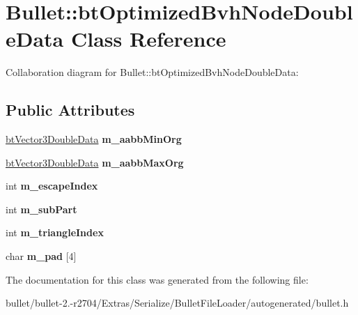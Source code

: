 \hypertarget{class_bullet_1_1bt_optimized_bvh_node_double_data}{\section{Bullet\+:\+:bt\+Optimized\+Bvh\+Node\+Double\+Data Class Reference}
\label{class_bullet_1_1bt_optimized_bvh_node_double_data}
}


Collaboration diagram for Bullet\+:\+:bt\+Optimized\+Bvh\+Node\+Double\+Data\+:
\subsection*{Public Attributes}
\begin{DoxyCompactItemize}
\item 
\hypertarget{class_bullet_1_1bt_optimized_bvh_node_double_data_af91bb104a9c2d089522a8e490e0158e2}{\hyperlink{class_bullet_1_1bt_vector3_double_data}{bt\+Vector3\+Double\+Data} {\bfseries m\+\_\+aabb\+Min\+Org}}\label{class_bullet_1_1bt_optimized_bvh_node_double_data_af91bb104a9c2d089522a8e490e0158e2}

\item 
\hypertarget{class_bullet_1_1bt_optimized_bvh_node_double_data_a8c56c16493d9f31fcc070a5057eb9e99}{\hyperlink{class_bullet_1_1bt_vector3_double_data}{bt\+Vector3\+Double\+Data} {\bfseries m\+\_\+aabb\+Max\+Org}}\label{class_bullet_1_1bt_optimized_bvh_node_double_data_a8c56c16493d9f31fcc070a5057eb9e99}

\item 
\hypertarget{class_bullet_1_1bt_optimized_bvh_node_double_data_a642d26b8393b1cff8ec6ca71945bb9b9}{int {\bfseries m\+\_\+escape\+Index}}\label{class_bullet_1_1bt_optimized_bvh_node_double_data_a642d26b8393b1cff8ec6ca71945bb9b9}

\item 
\hypertarget{class_bullet_1_1bt_optimized_bvh_node_double_data_afcd11a1527a7046f3b884c2e3ab30366}{int {\bfseries m\+\_\+sub\+Part}}\label{class_bullet_1_1bt_optimized_bvh_node_double_data_afcd11a1527a7046f3b884c2e3ab30366}

\item 
\hypertarget{class_bullet_1_1bt_optimized_bvh_node_double_data_a09797e2318d6f745394378ab22c20b99}{int {\bfseries m\+\_\+triangle\+Index}}\label{class_bullet_1_1bt_optimized_bvh_node_double_data_a09797e2318d6f745394378ab22c20b99}

\item 
\hypertarget{class_bullet_1_1bt_optimized_bvh_node_double_data_ad7dea16ca7dbb4a8e7616d86bf8fb154}{char {\bfseries m\+\_\+pad} \mbox{[}4\mbox{]}}\label{class_bullet_1_1bt_optimized_bvh_node_double_data_ad7dea16ca7dbb4a8e7616d86bf8fb154}

\end{DoxyCompactItemize}


The documentation for this class was generated from the following file\+:\begin{DoxyCompactItemize}
\item 
bullet/bullet-\/2.-\/r2704/\+Extras/\+Serialize/\+Bullet\+File\+Loader/autogenerated/bullet.\+h\end{DoxyCompactItemize}
